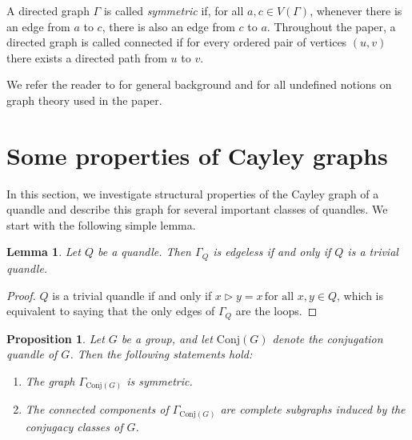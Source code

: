 \documentclass[english,11pt]{amsart}
\newtheorem{Lemma}[Theorem]{Lemma}
\newtheorem{Proposition}[Theorem]{Proposition}
\begin{document}
A directed graph $\Gamma$ is called \emph{symmetric} if, for all $a,c\in V(\Gamma)$, whenever there is an edge from $a$ to $c$, there is also an edge from $c$ to $a$. Throughout the paper, a directed graph is called connected if for every ordered pair of vertices $(u,v)$ there exists a directed path from $u$ to $v$.

We refer the reader to \cite{Diestel} for general background and for all undefined notions on graph theory used in the paper.


\bigskip

 \section{Some properties of Cayley graphs}
\bigskip

In this section, we investigate structural properties of the Cayley graph of a quandle and describe this graph for several important classes of quandles.
We start with the following simple lemma.

\begin{Lemma}
   Let $Q$ be a quandle. Then $\Gamma_Q$ is edgeless if and only if $Q$ is a trivial quandle.
\end{Lemma}
\begin{proof}
   $Q$ is a trivial quandle if and only if $x \rhd y = x \, \text{for all } x,y \in Q$, which is equivalent to saying that the only edges of $\Gamma_Q$ are the loops.
\end{proof}

\begin{Proposition}
 \label{conj}
Let $G$ be a group, and let $\mathrm{Conj}(G)$ denote the conjugation quandle of $G$. Then the following statements hold:
\begin{enumerate}
    \item 
    \label{conj1}
    The graph $\Gamma_{\mathrm{Conj}(G)}$ is symmetric.

    \item
    The connected components of $\Gamma_{\mathrm{Conj}(G)}$ are complete subgraphs induced by the conjugacy classes of $G$. 
        
\end{enumerate}
\end{Proposition}
\end{document}
